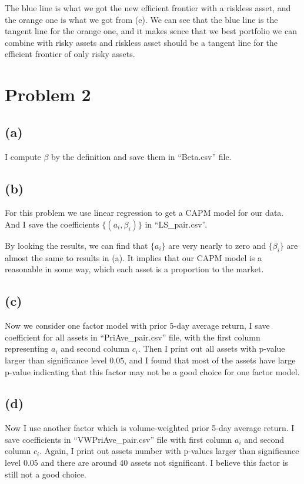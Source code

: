 \documentclass[letterpaper,11pt]{article}
\begin{document}
\begin{spacing}{1.2}
The blue line is what we got the new efficient frontier with a riskless asset, and the orange one is what we got from (e). We can see that the blue line is the tangent line for the orange one, and it makes sence that we best portfolio we can combine with risky assets and riskless asset should be a tangent line for the efficient frontier of only risky assets.


\section*{Problem 2}
\subsection*{(a)}
I compute $\beta$ by the definition and save them in ``Beta.csv'' file.

\subsection*{(b)}
For this problem we use linear regression to get a CAPM model for our data. And I save the coefficients $\{(a_i,\beta_i)\}$ in ``LS\_pair.csv''.

By looking the results, we can find that $\{a_i\}$ are very nearly to zero and $\{\beta_i\}$ are almost the same to results in (a). It implies that our CAPM model is a reasonable in some way, which each asset is a proportion to the market.

\subsection*{(c)}
Now we consider one factor model with prior 5-day average return, I save coefficient for all assets in ``PriAve\_pair.csv'' file, with the first column representing $a_i$ and second column $c_i$. Then I print out all assets with p-value larger than significance level $0.05$, and I found that most of the assets have large p-value indicating that this factor may not be a good choice for one factor model.

\subsection*{(d)}
Now I use another factor which is volume-weighted prior 5-day average return. I save coefficients in ``VWPriAve\_pair.csv'' file with first column $a_i$ and second column $c_i$. Again, I print out assets number with p-values larger than significance level $0.05$ and there are around 40 assets not significant. I believe this factor is still not a good choice.


\end{spacing}
\end{document}
